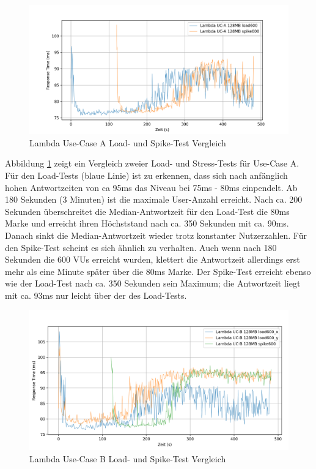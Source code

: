 \begin{figure}[H]
    \includegraphics[width=\textwidth]{img/lambda-uca-load600-vs-spike600-example.png}
    \caption[Lambda Use-Case A Load- und Spike-Test Vergleich]{Lambda Use-Case A Load- und Spike-Test Vergleich}
    \label{fig:lambda-uca-load600-vs-spike600-example}
\end{figure}

Abbildung \ref{fig:lambda-uca-load600-vs-spike600-example} zeigt ein Vergleich zweier Load- und Stress-Tests für Use-Case A. Für den Load-Tests (blaue Linie) ist zu erkennen, dass sich nach anfänglich hohen Antwortzeiten von ca 95ms das Niveau bei 75ms - 80ms einpendelt. Ab 180 Sekunden (3 Minuten) ist die maximale User-Anzahl erreicht. Nach ca. 200 Sekunden überschreitet die Median-Antwortzeit für den Load-Test die 80ms Marke und erreicht ihren Höchststand nach ca. 350 Sekunden mit ca. 90ms. Danach sinkt die Median-Antwortzeit wieder trotz konstanter Nutzerzahlen.
Für den Spike-Test scheint es sich ähnlich zu verhalten. Auch wenn nach 180 Sekunden die 600 VUs erreicht wurden, klettert die Antwortzeit allerdings erst mehr als eine Minute später über die 80ms Marke. Der Spike-Test erreicht ebenso wie der Load-Test nach ca. 350 Sekunden sein Maximum; die Antwortzeit liegt mit ca. 93ms nur leicht über der des Load-Tests.

\begin{figure}[H]
    \includegraphics[width=\textwidth]{img/lambda-ucb-load600-vs-spike600-example2.png}
    \caption[Lambda Use-Case B Load- und Spike-Test Vergleich]{Lambda Use-Case B Load- und Spike-Test Vergleich}
    \label{fig:lambda-ucb-load600-vs-spike600-example}
\end{figure}


